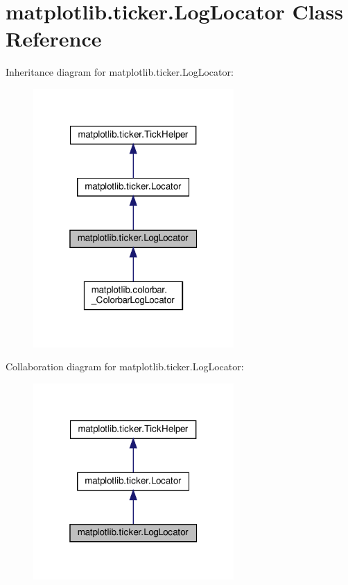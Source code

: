 \hypertarget{classmatplotlib_1_1ticker_1_1LogLocator}{}\section{matplotlib.\+ticker.\+Log\+Locator Class Reference}
\label{classmatplotlib_1_1ticker_1_1LogLocator}


Inheritance diagram for matplotlib.\+ticker.\+Log\+Locator\+:
\nopagebreak
\begin{figure}[H]
\begin{center}
\leavevmode
\includegraphics[width=217pt]{classmatplotlib_1_1ticker_1_1LogLocator__inherit__graph}
\end{center}
\end{figure}


Collaboration diagram for matplotlib.\+ticker.\+Log\+Locator\+:
\nopagebreak
\begin{figure}[H]
\begin{center}
\leavevmode
\includegraphics[width=217pt]{classmatplotlib_1_1ticker_1_1LogLocator__coll__graph}
\end{center}
\end{figure}
